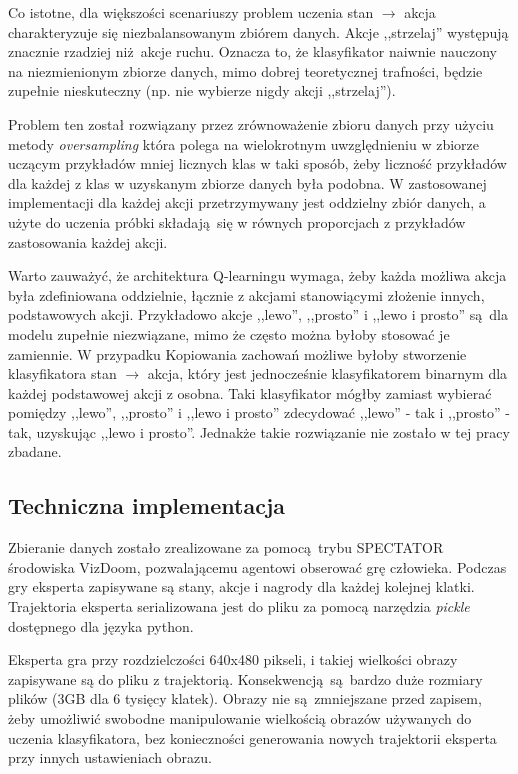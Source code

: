 Co istotne, dla większości scenariuszy problem uczenia stan $\to$ akcja charakteryzuje się niezbalansowanym zbiórem danych. Akcje ,,strzelaj'' występują znacznie rzadziej niż akcje ruchu. Oznacza to, że klasyfikator naiwnie nauczony na niezmienionym zbiorze danych, mimo dobrej teoretycznej trafności, będzie zupełnie nieskuteczny (np. nie wybierze nigdy akcji ,,strzelaj'').

Problem ten został rozwiązany przez zrównoważenie zbioru danych przy użyciu metody \textit{oversampling} która polega na wielokrotnym uwzględnieniu w zbiorze uczącym przykładów mniej licznych klas w taki sposób, żeby liczność przykładów dla każdej z klas w uzyskanym zbiorze danych była podobna. W zastosowanej implementacji dla każdej akcji przetrzymywany jest oddzielny zbiór danych, a użyte do uczenia próbki składają się w równych proporcjach z przykładów zastosowania każdej akcji. 

Warto zauważyć, że architektura Q-learningu wymaga, żeby każda możliwa akcja była zdefiniowana oddzielnie, łącznie z akcjami stanowiącymi złożenie innych, podstawowych akcji. Przykładowo akcje ,,lewo'', ,,prosto'' i ,,lewo i prosto'' są dla modelu zupełnie niezwiązane, mimo że często można byłoby stosować je zamiennie. W przypadku Kopiowania zachowań możliwe byłoby stworzenie klasyfikatora  stan $\to$ akcja, który jest jednocześnie klasyfikatorem binarnym dla każdej podstawowej akcji z osobna. Taki klasyfikator mógłby zamiast wybierać pomiędzy ,,lewo'', ,,prosto'' i ,,lewo i prosto'' zdecydować ,,lewo'' - tak i ,,prosto'' - tak, uzyskując ,,lewo i prosto''. Jednakże takie rozwiązanie nie zostało w tej pracy zbadane.

\subsection{Techniczna implementacja} \label{behavioral_cloning_tech}

Zbieranie danych zostało zrealizowane za pomocą trybu SPECTATOR środowiska VizDoom, pozwalającemu agentowi obserować grę człowieka. Podczas gry eksperta zapisywane są stany, akcje i nagrody dla każdej kolejnej klatki. Trajektoria eksperta serializowana jest do pliku za pomocą narzędzia \textit{pickle} dostępnego dla języka python.

Eksperta gra przy rozdzielczości 640x480 pikseli, i takiej wielkości obrazy zapisywane są do pliku z trajektorią. Konsekwencją są bardzo duże rozmiary plików (3GB dla 6 tysięcy klatek). Obrazy nie są zmniejszane przed zapisem, żeby umożliwić swobodne manipulowanie wielkością obrazów używanych do uczenia klasyfikatora, bez konieczności generowania nowych trajektorii eksperta przy innych ustawieniach obrazu.

